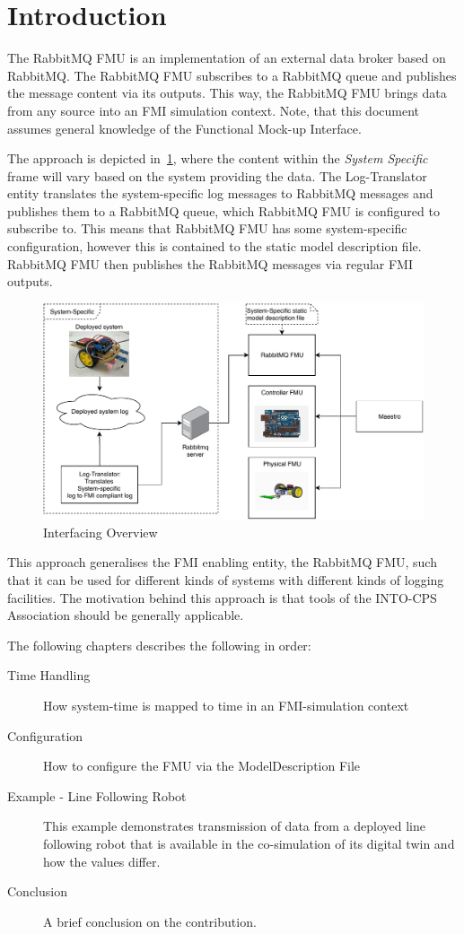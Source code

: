 \section{Introduction}\label{sec:intro}
The RabbitMQ FMU is an implementation of an external data broker based on
RabbitMQ. The RabbitMQ FMU subscribes to a RabbitMQ queue and publishes the
message content via its outputs. This way, the RabbitMQ FMU brings data from any source into an
FMI simulation context. Note, that this document assumes general knowledge of
the Functional Mock-up Interface.

The approach is depicted in~\cref{fig:interfacing_overview}, where
the content within the \textit{System Specific} frame will vary based on the system
providing the data. The Log-Translator entity translates the
system-specific log messages to RabbitMQ messages and publishes them to a
RabbitMQ queue, which RabbitMQ FMU is configured to subscribe to. This means
that RabbitMQ FMU has some system-specific configuration, however this is
contained to the static model description file. RabbitMQ FMU then publishes the
RabbitMQ messages via regular FMI outputs.

\begin{figure}[htb]
  \includegraphics[width=\textwidth]{figures/overview.pdf}
  \caption{Interfacing Overview}
 \label{fig:interfacing_overview}
\end{figure}

This approach generalises the FMI enabling entity, the RabbitMQ FMU, such that
it can be used for different kinds of systems with different kinds of logging
facilities.
The motivation behind this approach is that tools of the INTO-CPS Association
should be generally applicable.

The following chapters describes the following in order:
\begin{description}
  \item[Time Handling] How system-time is mapped to time in an FMI-simulation
    context
  \item[Configuration] How to configure the FMU via the ModelDescription File
  \item[Example - Line Following Robot] This example demonstrates transmission
    of data from a deployed line following robot that is available in the
    co-simulation of its digital twin and how the values differ.
  \item[Conclusion] A brief conclusion on the contribution.
\end{description}


